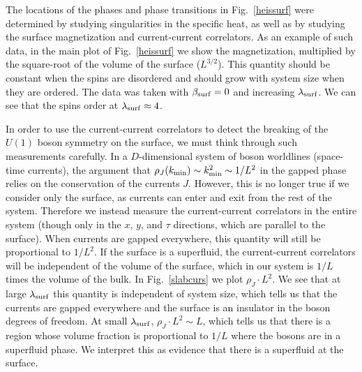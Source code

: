 \documentclass[prb,twocolumn]{revtex4-1}
\begin{document}
The locations of the phases and phase transitions in Fig.~\ref{heissurf} were determined by studying singularities in the specific heat, as well as by studying the surface magnetization and current-current correlators. As an example of such data, in the main plot of Fig.~\ref{heissurf} we show the magnetization, multiplied by the square-root of the volume of the surface ($L^{3/2}$). This quantity should be constant when the spins are disordered and should grow with system size when they are ordered. The data was taken with $\beta_{\rm surf}=0$ and increasing $\lambda_{\rm surf}$. We can see that the spins order at $\lambda_{\rm surf} \approx 4$. 

In order to use the current-current correlators to detect the breaking of the $U(1)$ boson symmetry on the surface, we must think through such measurements carefully.  In a $D$-dimensional system of boson worldlines (space-time currents), the argument that $\rho_J(k_{\rm min}) \sim k_{\rm min}^2 \sim 1/L^2$ in the gapped phase relies on the conservation of the currents $J$.  However, this is no longer true if we consider only the surface, as currents can enter and exit from the rest of the system.  
Therefore we instead measure the current-current correlators in the entire system (though only in the $x$, $y$, and $\tau$ directions, which are parallel to the surface). When currents are gapped everywhere, this quantity will still be proportional to $1/L^2$. If the surface is a superfluid, the current-current correlators will be independent of the volume of the surface, which in our system is $1/L$ times the volume of the bulk. In Fig.~\ref{slabcurs} we plot $\rho_J \cdot L^2$. We see that at large $\lambda_{\rm surf}$ this quantity is independent of system size, which tells us that the currents are gapped everywhere and the surface is an insulator in the boson degrees of freedom. At small $\lambda_{\rm surf}$, $\rho_J\cdot L^2 \sim L$, which tells us that there is a region whose volume fraction is proportional to $1/L$ where the bosons are in a superfluid phase. We interpret this as evidence that there is a superfluid at the surface.
\end{document}
